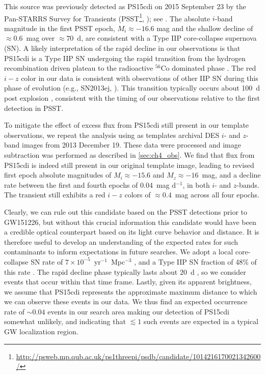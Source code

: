\clearpage
This source was previously detected as PS15cdi on 2015 September 23 by the Pan-STARRS
Survey for Transients (PSST\footnote{\url{http://psweb.mp.qub.ac.uk/ps1threepi/psdb/candidate/1014216170021342600/}},
\citealt{Huber+15}); see . The absolute $i$-band
magnitude in the first PSST epoch, $M_i\approx -16.6$ mag and the shallow decline of $\approx0.6$~mag
over $\approx70$~d, are consistent with a Type IIP core-collapse supernova (SN).
A likely interpretation of the rapid decline in our observations is that PS15cdi is a Type IIP SN undergoing
the rapid transition from the hydrogen recombination driven plateau to the radioactive $^{56}$Co dominated
phase \citep{KasenWoosley09,Sanders+15,Dhungana+16}. The red $i-z$ color in our data is consistent with observations
of other IIP SN during this phase of evolution (e.g., SN2013ej, \citealt{Dhungana+16}).
This transition typically occurs about 100~d post explosion \citep{KasenWoosley09,Sanders+15,Dhungana+16}, consistent with the
timing of our observations relative to the first detection in PSST.

To mitigate the effect of excess flux from PS15cdi still present in our template observations, we repeat the analysis
using as templates archival DES $i$- and $z$-band images from 2013 December 19. These data were processed
and image subtraction was performed as described in \cref{sec:ch4_obs}. We find that flux from PS15cdi is indeed still present
in our original template image, leading to revised first epoch absolute magnitudes of $M_i \approx -15.6$ and
$M_z \approx -16$~mag, and a decline rate between the first and fourth epochs of 0.04~mag d$^{-1}$, in both
$i$- and $z$-bands. The transient still exhibits a red $i-z$ colors of $\approx 0.4$~mag across all four epochs.

\clearpage
Clearly, we can rule out this candidate based on the PSST detections prior to
GW151226, but without this crucial information this candidate
would have been a credible optical counterpart based on its light curve behavior and distance.
It is therefore useful to develop an understanding of the expected rates for such contaminants
to inform expectations in future searches. We adopt a local core-collapse SN rate of
$7\times10^{-5}$~yr$^{-1}$~Mpc$^{-3}$ \citep{Li+11,Cappellaro+15},
and a Type IIP SN fraction of 48\% of this rate \citep{Smith+11}. The rapid
decline phase typically lasts about $20$~d \citep{KasenWoosley09,Sanders+15,Dhungana+16},
so we consider events that occur within that time frame. Lastly, given its apparent brightness,
we assume that PS15cdi represents the approximate maximum distance to which we can observe
these events in our data. We thus find an expected occurrence rate of $\sim 0.04$ events in our search area
making our detection of PS15cdi somewhat unlikely, and indicating that $\lesssim 1$ such
events are expected in a typical GW localization region.

